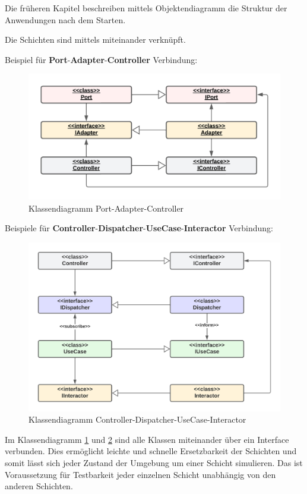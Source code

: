 Die früheren Kapitel beschreiben mittels Objektendiagramm die Struktur der Anwendungen nach dem Starten.

Die Schichten sind mittels \textbf{} miteinander verknüpft.

Beispiel für \textbf{Port}-\textbf{Adapter}-\textbf{Controller} Verbindung:

\begin{figure}[H]
    \centering
    \includegraphics[width=12cm]{./images/Klassendiagramm Port-Adapter.png}
    \caption[Klassendiagramm Port-Adapter-Controller]{Klassendiagramm Port-Adapter-Controller}
    \label{fig:FullCDPAC}
\end{figure}

Beispiele für \textbf{Controller}-\textbf{Dispatcher}-\textbf{UseCase}-\textbf{Interactor} Verbindung:
\begin{figure}[H]
    \centering
    \includegraphics[width=12cm]{./images/CDUI-Klassendiagramm.png}
    \caption[Klassendiagramm Controller-Dispatcher-UseCase-Interactor]{Klassendiagramm Controller-Dispatcher-UseCase-Interactor}
    \label{fig:FullCDCDUI}
\end{figure}

Im Klassendiagramm \ref{fig:FullCDPAC} und \ref{fig:FullCDCDUI} sind alle Klassen miteinander über ein Interface verbunden.
Dies ermöglicht leichte und schnelle Ersetzbarkeit der Schichten und 
somit lässt sich jeder Zustand der Umgebung um einer Schicht simulieren. 
Das ist Voraussetzung für Testbarkeit jeder einzelnen Schicht unabhängig von den anderen Schichten.